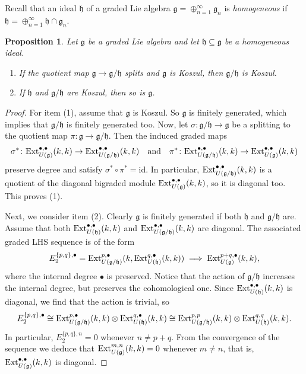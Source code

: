 \documentclass[10pt]{amsart}
\newtheorem{prop}[theorem]{Proposition}
\theoremstyle{definition}
\newcommand{\Ext}{{\rm Ext}}
\newcommand{\g}{\mathfrak{g}}
\newcommand{\h}{\mathfrak{h}}
\newcommand{\id}{\mathrm{id}}
\theoremstyle{definition}
\numberwithin{equation}{section}
\begin{document}
Recall that an ideal $\h$ of a graded Lie algebra $\g = \oplus_{n=1}^\infty \g_n$ is \emph{homogeneous} if $\h = \oplus_{n=1}^\infty \h \cap \g_n$.


\begin{prop} \label{Koszul.prop}
 Let $\g$ be a graded Lie algebra and let $\h \subseteq \g$ be a homogeneous ideal.
 \begin{enumerate}
  \item If the quotient map $\g \to \g/\h$ splits and $\g$ is Koszul, then $\g/\h$ is Koszul.
  \item If $\h$ and $\g/\h$ are Koszul, then so is $\g$.
 \end{enumerate}
\end{prop}
\begin{proof}
 For item (1), assume that $\g$ is Koszul. So $\g$ is finitely generated, which implies that $\g/\h$ is finitely generated too. Now, let $\sigma \colon \g/\h \to \g$ be a splitting to the quotient map $\pi \colon \g \to \g/\h$. Then the induced graded maps
  \[ \sigma^{\ast} \colon \Ext_{U(\g)}^{\bullet,\bullet}(k,k) \to \Ext_{U(\g/\h)}^{\bullet,\bullet}(k,k)\  \ \text{  and  }\  \
  \pi^{\ast} \colon \Ext_{U(\g/\h)}^{\bullet,\bullet}(k,k) \to \Ext_{U(\g)}^{\bullet,\bullet}(k,k)\]
  preserve degree and satisfy $\sigma^\ast \circ \pi^\ast = \id$. In particular, $\Ext_{U(\g/\h)}^{\bullet,\bullet}(k,k)$ is a quotient of the diagonal bigraded module $\Ext_{U(\g)}^{\bullet,\bullet}(k,k)$, so it is diagonal too. This proves (1).

  Next, we consider item (2). Clearly $\g$ is finitely generated if both $\h$ and $\g/\h$ are. Assume that both $\Ext_{U(\h)}^{\bullet,\bullet}(k,k)$ and $ \Ext_{U(\g/\h)}^{\bullet,\bullet}(k,k)$ are diagonal. The associated graded LHS sequence is of the form
  \[ E_2^{\{p,q\},\bullet} =  \Ext_{U(\g/\h)}^{p,\bullet}(k, \Ext_{U(\h)}^{q,\bullet}(k,k)) \implies \Ext_{U(\g)}^{p+q,\bullet}(k,k),\]
 where the internal degree $\bullet$ is preserved. Notice that the action of $\g/\h$  increases
the internal degree, but preserves the cohomological one. Since $\Ext_{U(\h)}^{\bullet,\bullet}(k,k)$ is diagonal, we find that the action is trivial, so
    \[ E_2^{\{p,q\},\bullet}  \cong  \Ext_{U(\g/\h)}^{p,\bullet}(k,k) \otimes \Ext_{U(\h)}^{q,\bullet}(k,k) \cong \Ext_{U(\g/\h)}^{p,p}(k,k) \otimes \Ext_{U(\h)}^{q,q}(k,k).\]
 In particular, $E_2^{\{p,q\},n} = 0$ whenever $n \neq p+q$. From the convergence of the sequence we deduce that $\Ext_{U(\g)}^{m,n}(k,k)=0 $ whenever $m \neq n$, that is, $\Ext_{U(\g)}^{\bullet,\bullet}(k,k)$ is diagonal.
\end{proof}
\end{document}
